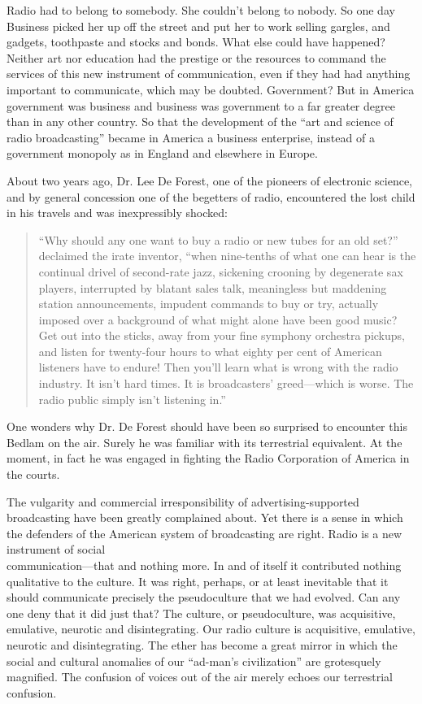 \documentclass[nohyper,openany,nobib]{tufte-book}
\begin{document}
Radio had to belong to somebody. She couldn't belong to nobody. So one
day Business picked her up off the street and put her to work selling
gargles, and gadgets, toothpaste and stocks and bonds. What else could
have happened? Neither art nor education had the prestige or the
resources to command the services of this new instrument of
communication, even if they had had anything important to communicate,
which may be doubted. Government? But in America government was business
and business was government to a far greater degree than in any other
country. So that the development of the ``art and science of radio
broadcasting'' became in America a business enterprise, instead of a
government monopoly as in England and elsewhere in Europe.

About two years ago, Dr. Lee De Forest, one of the pioneers of
electronic science, and by general concession one of the begetters of
radio, encountered the lost child in his travels and was inexpressibly
shocked:

\begin{quote}
``Why should any one want to buy a radio or new tubes for an old set?''
declaimed the irate inventor, ``when nine-tenths of what one can hear is
the continual drivel of second-rate jazz, sickening crooning by
degenerate sax players, interrupted by blatant sales talk, meaningless
but maddening station announcements, impudent commands to buy or try,
actually imposed over a background of what might alone have been good
music? Get out into the sticks, away from your fine symphony orchestra
pickups, and listen for twenty-four hours to what eighty per cent of
American listeners have to endure! Then you'll learn what is wrong with
the radio industry. It isn't hard times. It is broadcasters'
greed---which is worse. The radio public simply isn't listening in.''
\end{quote}

One wonders why Dr. De Forest should have been so surprised to encounter
this Bedlam on the air. Surely he was familiar with its terrestrial
equivalent. At the moment, in fact he was engaged in fighting the Radio
Corporation of America in the courts.

The vulgarity and commercial irresponsibility of advertising-supported
broadcasting have been greatly complained about. Yet there is a sense in
which the defenders of the American system of broadcasting are right.
Radio is a new instrument of social\\ \noindent communication---that and nothing
more. In and of itself it contributed nothing qualitative to the
culture. It was right, perhaps, or at least inevitable that it should
communicate precisely the pseudoculture that we had evolved. Can any one
deny that it did just that? The culture, or pseudoculture, was
acquisitive, emulative, neurotic and disintegrating. Our radio culture
is acquisitive, emulative, neurotic and disintegrating. The ether has
become a great mirror in which the social and cultural anomalies of our
``ad-man's civilization'' are grotesquely magnified. The confusion of
voices out of the air merely echoes our terrestrial confusion.
\end{document}
